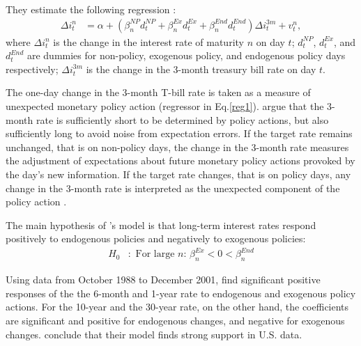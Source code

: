 \documentclass[11pt,a4paper,english,oneside]{book}
\numberwithin{equation}{chapter}
\begin{document}
They estimate the following regression \cite[~p. 13]{Ellingsen.2003}:
\begin{align}\label{reg1}
\Delta i^n_t &= \alpha + (\beta_n^{NP}d_t^{NP} + \beta_n^{Ex}d_t^{Ex} + \beta_n^{End}d_t^{End})\Delta i^{3m}_t + v_t^n,
\end{align}
where $\Delta i^n_t$ is the change in the interest rate of maturity $n$ on day $t$; $d_t^{NP}$, $d_t^{Ex}$, and $d_t^{End}$ are dummies for non-policy, exogenous policy, and endogenous policy days respectively; $\Delta i^{3m}_t$ is the change in the 3-month treasury bill rate on day $t$.

The one-day change in the 3-month T-bill rate is taken as a measure of unexpected monetary policy action (regressor in Eq.\ref{reg1}). \citet[~p. 13]{Ellingsen.2003} argue that the 3-month rate is sufficiently short to be determined by policy actions, but also sufficiently long to avoid noise from expectation errors. If the target rate remains unchanged, that is on non-policy days, the change in the 3-month rate measures the adjustment of expectations about future monetary policy actions provoked by the day's new information. If the target rate changes, that is on policy days, any change in the 3-month rate is interpreted as the unexpected component of the policy action \citep[~p. 12]{Ellingsen.2003}.

The main hypothesis of \citeauthor{Ellingsen.2003}'s model is that long-term interest rates respond positively to endogenous policies and negatively to exogenous policies:
\begin{align}\label{H0}
H_0&:  \text{ For large $n$: } \beta_n^{Ex}<0< \beta_n^{End}
\end{align}

%

Using data from October 1988 to December 2001, \citet[~p. 16]{Ellingsen.2003} find significant positive responses of the the 6-month and 1-year rate to endogenous and exogenous policy actions. For the 10-year and the 30-year rate, on the other hand, the coefficients are significant and positive for endogenous changes, and negative for exogenous changes. \citeauthor{Ellingsen.2003} conclude that their model finds strong support in U.S. data. 
\end{document}
